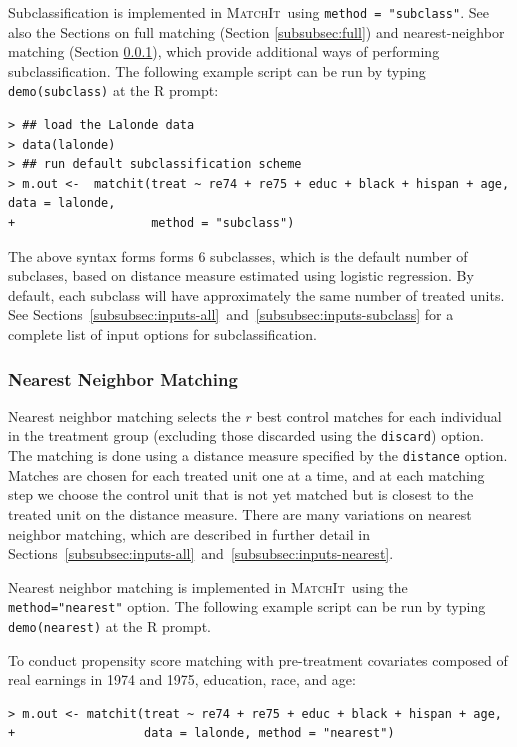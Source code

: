 \documentclass[oneside,letterpaper,titlepage]{article}
\newcommand{\MatchIt}{\textsc{MatchIt}}
\begin{document}
Subclassification is implemented in \MatchIt\ using \texttt{method =
  "subclass"}.  See also the Sections on full matching (Section
\ref{subsubsec:full}) and nearest-neighbor matching (Section
\ref{subsubsec:nearest}), which provide additional ways of performing
subclassification.  The following example script can be run by typing
{\tt demo(subclass)} at the R prompt:
\begin{verbatim}
> ## load the Lalonde data
> data(lalonde)
> ## run default subclassification scheme
> m.out <-  matchit(treat ~ re74 + re75 + educ + black + hispan + age, data = lalonde, 
+                   method = "subclass")
\end{verbatim}
The above syntax forms forms 6 subclasses, which is the default number
of subclases, based on distance measure estimated using logistic
regression.  By default, each subclass will have approximately the
same number of treated units.  See
Sections~\ref{subsubsec:inputs-all}~and~\ref{subsubsec:inputs-subclass}
for a complete list of input options for subclassification.

\subsubsection{Nearest Neighbor Matching}
\label{subsubsec:nearest}

Nearest neighbor matching selects the $r$ best control matches for
each individual in the treatment group (excluding those discarded
using the \texttt{discard}) option.  The matching is done using a
distance measure specified by the {\tt distance} option. Matches are
chosen for each treated unit one at a time, and at each matching step
we choose the control unit that is not yet matched but is closest to
the treated unit on the distance measure.  There are many variations
on nearest neighbor matching, which are described in further detail in
Sections~\ref{subsubsec:inputs-all}~and~\ref{subsubsec:inputs-nearest}.

Nearest neighbor matching is implemented in \MatchIt\ using the
\texttt{method="nearest"} option.  The following example script can be
run by typing {\tt demo(nearest)} at the R prompt.

To conduct propensity score matching with pre-treatment covariates
composed of real earnings in 1974 and 1975, education, race, and age:
\begin{verbatim}
> m.out <- matchit(treat ~ re74 + re75 + educ + black + hispan + age,
+                  data = lalonde, method = "nearest")
\end{verbatim}
\end{document}
